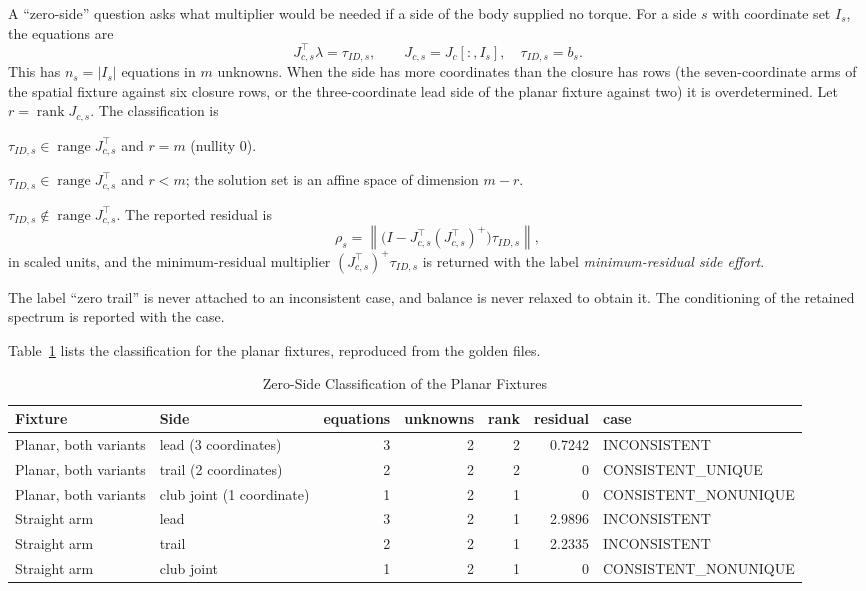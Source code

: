 \documentclass[11pt,a4paper]{article}
\newcommand{\rank}{\operatorname{rank}}
\newcommand{\range}{\operatorname{range}}
\begin{document}
A ``zero-side'' question asks what multiplier would be needed if a side of the
body supplied no torque.  For a side $s$ with coordinate set $I_s$, the
equations are
\begin{equation}
J_{c,s}^{\top}\lambda=\tau_{ID,s},\qquad J_{c,s}=J_c[:,I_s],\quad
\tau_{ID,s}=b_s .
\end{equation}
This has $n_s=|I_s|$ equations in $m$ unknowns.  When the side has more coordinates than the
closure has rows (the seven-coordinate arms of the spatial fixture against six
closure rows, or the three-coordinate lead side of the planar fixture against
two) it is overdetermined.  Let $r=\rank J_{c,s}$.  The
classification is
\begin{description}[leftmargin=*]
\item[CONSISTENT\_UNIQUE] $\tau_{ID,s}\in\range J_{c,s}^{\top}$ and
$r=m$ (nullity $0$).
\item[CONSISTENT\_NONUNIQUE] $\tau_{ID,s}\in\range J_{c,s}^{\top}$ and $r<m$;
the solution set is an affine space of dimension $m-r$.
\item[INCONSISTENT] $\tau_{ID,s}\notin\range J_{c,s}^{\top}$.  The reported
residual is
\begin{equation}
\rho_s=\left\lVert\bigl(I-J_{c,s}^{\top}(J_{c,s}^{\top})^{+}\bigr)
\tau_{ID,s}\right\rVert,
\end{equation}
in scaled units, and the minimum-residual multiplier
$(J_{c,s}^{\top})^{+}\tau_{ID,s}$ is returned with the label
\emph{minimum-residual side effort}.
\end{description}
The label ``zero trail'' is never attached to an inconsistent case, and balance
is never relaxed to obtain it.  The conditioning of the retained spectrum is
reported with the case.

Table~\ref{tab:zeroside} lists the classification for the planar fixtures,
reproduced from the golden files.

\begin{table}[ht]
\centering
\caption{Zero-Side Classification of the Planar Fixtures}
\label{tab:zeroside}
\small
\begin{tabular}{@{}llrrrrl@{}}
\toprule
Fixture & Side & equations & unknowns & rank & residual & case \\
\midrule
Planar, both variants & lead (3 coordinates) & 3 & 2 & 2 & 0.7242 & INCONSISTENT \\
Planar, both variants & trail (2 coordinates) & 2 & 2 & 2 & 0 & CONSISTENT\_UNIQUE \\
Planar, both variants & club joint (1 coordinate) & 1 & 2 & 1 & 0 & CONSISTENT\_NONUNIQUE \\
Straight arm & lead & 3 & 2 & 1 & 2.9896 & INCONSISTENT \\
Straight arm & trail & 2 & 2 & 1 & 2.2335 & INCONSISTENT \\
Straight arm & club joint & 1 & 2 & 1 & 0 & CONSISTENT\_NONUNIQUE \\
\bottomrule
\end{tabular}
\end{table}
\end{document}
